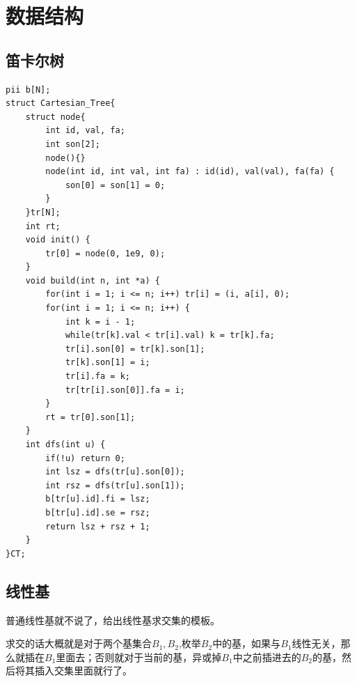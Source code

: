 \documentclass[a4paper,11pt,twoside,fontset = fandol,UTF8]{ctexbook} %
\begin{document}
	\chapter{数据结构}
	\section{笛卡尔树}
	\begin{lstlisting}
pii b[N];
struct Cartesian_Tree{
    struct node{
        int id, val, fa;
        int son[2];
        node(){}
        node(int id, int val, int fa) : id(id), val(val), fa(fa) {
            son[0] = son[1] = 0;
        }
    }tr[N];
    int rt;
    void init() {
        tr[0] = node(0, 1e9, 0);
    }
    void build(int n, int *a) {
        for(int i = 1; i <= n; i++) tr[i] = (i, a[i], 0);
        for(int i = 1; i <= n; i++) {
            int k = i - 1;
            while(tr[k].val < tr[i].val) k = tr[k].fa;
            tr[i].son[0] = tr[k].son[1];
            tr[k].son[1] = i;
            tr[i].fa = k;
            tr[tr[i].son[0]].fa = i;
        }
        rt = tr[0].son[1];
    }
    int dfs(int u) {
        if(!u) return 0;
        int lsz = dfs(tr[u].son[0]);
        int rsz = dfs(tr[u].son[1]);
        b[tr[u].id].fi = lsz;
        b[tr[u].id].se = rsz;
        return lsz + rsz + 1;
    }
}CT; 
	\end{lstlisting}
	\section{线性基}
	普通线性基就不说了，给出线性基求交集的模板。
	
	求交的话大概就是对于两个基集合$B_1,B_2$,枚举$B_2$中的基，如果与$B_1$线性无关，那么就插在$B_1$里面去；否则就对于当前的基，异或掉$B_1$中之前插进去的$B_2$的基，然后将其插入交集里面就行了。
	
\end{document}
